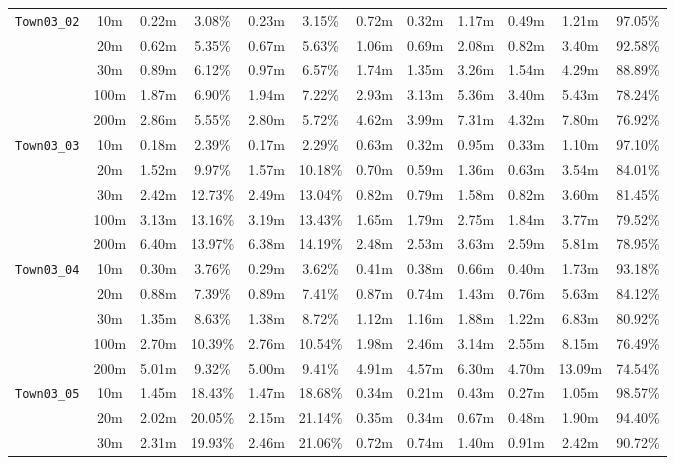 \begin{table}
{\begin{tabular}{@{}cccccccccccc@{}}
      \midrule
      \multirow{5}{*}{\Verb|Town03_02|} & 10m & 0.22m & 3.08\% & 0.23m & 3.15\% & 0.72m & 0.32m & 1.17m & 0.49m & 1.21m & 97.05\% \\
      & 20m & 0.62m & 5.35\% & 0.67m & 5.63\% & 1.06m & 0.69m & 2.08m & 0.82m & 3.40m & 92.58\% \\
      & 30m & 0.89m & 6.12\% & 0.97m & 6.57\% & 1.74m & 1.35m & 3.26m & 1.54m & 4.29m & 88.89\% \\
      & 100m & 1.87m & 6.90\% & 1.94m & 7.22\% & 2.93m & 3.13m & 5.36m & 3.40m & 5.43m & 78.24\% \\
      & 200m & 2.86m & 5.55\% & 2.80m & 5.72\% & 4.62m & 3.99m & 7.31m & 4.32m & 7.80m & 76.92\% \\
      \midrule
      \multirow{5}{*}{\Verb|Town03_03|} & 10m & 0.18m & 2.39\% & 0.17m & 2.29\% & 0.63m & 0.32m & 0.95m & 0.33m & 1.10m & 97.10\% \\
      & 20m & 1.52m & 9.97\% & 1.57m & 10.18\% & 0.70m & 0.59m & 1.36m & 0.63m & 3.54m & 84.01\% \\
      & 30m & 2.42m & 12.73\% & 2.49m & 13.04\% & 0.82m & 0.79m & 1.58m & 0.82m & 3.60m & 81.45\% \\
      & 100m & 3.13m & 13.16\% & 3.19m & 13.43\% & 1.65m & 1.79m & 2.75m & 1.84m & 3.77m & 79.52\% \\
      & 200m & 6.40m & 13.97\% & 6.38m & 14.19\% & 2.48m & 2.53m & 3.63m & 2.59m & 5.81m & 78.95\% \\
      \midrule
      \multirow{5}{*}{\Verb|Town03_04|} & 10m & 0.30m & 3.76\% & 0.29m & 3.62\% & 0.41m & 0.38m & 0.66m & 0.40m & 1.73m & 93.18\% \\
      & 20m & 0.88m & 7.39\% & 0.89m & 7.41\% & 0.87m & 0.74m & 1.43m & 0.76m & 5.63m & 84.12\% \\
      & 30m & 1.35m & 8.63\% & 1.38m & 8.72\% & 1.12m & 1.16m & 1.88m & 1.22m & 6.83m & 80.92\% \\
      & 100m & 2.70m & 10.39\% & 2.76m & 10.54\% & 1.98m & 2.46m & 3.14m & 2.55m & 8.15m & 76.49\% \\
      & 200m & 5.01m & 9.32\% & 5.00m & 9.41\% & 4.91m & 4.57m & 6.30m & 4.70m & 13.09m & 74.54\% \\
      \midrule
      \multirow{5}{*}{\Verb|Town03_05|} & 10m & 1.45m & 18.43\% & 1.47m & 18.68\% & 0.34m & 0.21m & 0.43m & 0.27m & 1.05m & 98.57\% \\
      & 20m & 2.02m & 20.05\% & 2.15m & 21.14\% & 0.35m & 0.34m & 0.67m & 0.48m & 1.90m & 94.40\% \\
      & 30m & 2.31m & 19.93\% & 2.46m & 21.06\% & 0.72m & 0.74m & 1.40m & 0.91m & 2.42m & 90.72\% \\

\end{tabular}}
\end{table}
